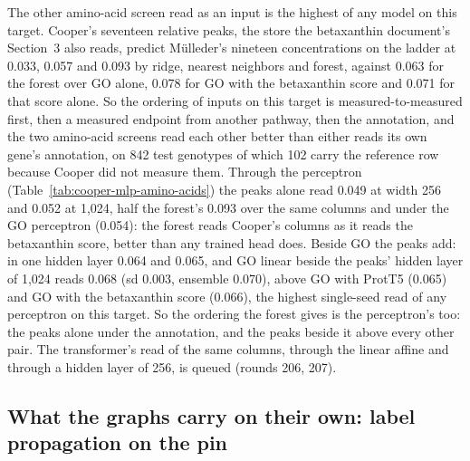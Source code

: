 The other amino-acid screen read as an input is the highest of any model on this target.
Cooper's seventeen relative peaks, the store the betaxanthin document's
Section~3 also reads, predict M\"ulleder's nineteen concentrations on the ladder at
0.033, 0.057 and 0.093 by ridge, nearest neighbors and forest, against 0.063 for the
forest over GO alone, 0.078 for GO with the betaxanthin score and 0.071 for that score
alone. So the ordering of inputs on this target is measured-to-measured first, then a
measured endpoint from another pathway, then the annotation, and the two amino-acid
screens read each other better than either reads its own gene's annotation, on 842 test
genotypes of which 102 carry the reference row because Cooper did not measure them.
Through the perceptron (Table~\ref{tab:cooper-mlp-amino-acids}) the peaks alone read
0.049 at width 256 and 0.052 at 1,024, half the forest's 0.093 over the same columns
and under the GO perceptron (0.054): the forest reads Cooper's columns as it reads
the betaxanthin score, better than any trained head does. Beside GO the peaks add: in
one hidden layer 0.064 and 0.065, and GO linear beside the peaks' hidden layer of
1,024 reads 0.068 (sd 0.003, ensemble 0.070), above GO with ProtT5 (0.065) and GO with
the betaxanthin score (0.066), the highest single-seed read of any perceptron on this
target. So the ordering the forest gives is the perceptron's too: the peaks alone
under the annotation, and the peaks beside it above every other pair. The
transformer's read of the same columns, through the linear affine and through a hidden
layer of 256, is queued (rounds 206, 207).









\subsection{What the graphs carry on their own: label propagation on the pin}
\label{sec:homophily}

